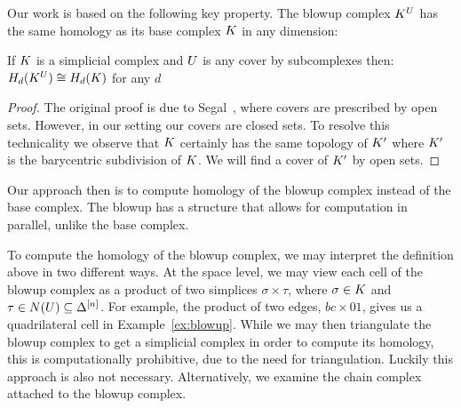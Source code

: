 Our work is based on the following key property.
The blowup complex $K^U$ has the same homology as its base complex $K$ in any 
dimension: 
\begin{theorem}
If $K$ is a simplicial complex and $U$ is any cover by subcomplexes then:
$H_d(K^U) \cong H_d(K)$ for any $d$
\end{theorem}
\begin{proof}
The original proof is due to Segal~\cite{segal}, where covers are prescribed by open sets. However, in our setting our covers are closed sets. To resolve this technicality we observe that $K$ certainly has the same topology of $K'$ where $K'$ is the barycentric subdivision of $K$. We will find a cover of $K'$ by open sets. 

\end{proof}
Our approach then is to compute homology of the blowup complex 
instead of the base complex. The blowup has a structure that allows 
for computation in parallel, unlike the base complex.

To compute the homology of the blowup complex, we may interpret the definition 
above in two different ways.  
At the space level, we may view each cell of the blowup complex as a product 
of two simplices $\sigma \times \tau$, where 
$\sigma \in K$ and $\tau \in N(U) \subseteq \Delta^{[n]}$.  
For example, the product of two edges, $bc \times 01$, gives us a 
quadrilateral cell in Example~\ref{ex:blowup}.  
While we may then triangulate the blowup complex to get a simplicial complex in order 
to compute its homology, this is computationally prohibitive, due to the need for triangulation. 
Luckily this approach is also not necessary. Alternatively, we 
examine the chain complex attached to the blowup complex.

